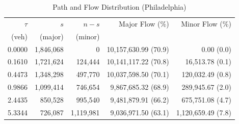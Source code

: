 \documentclass[11pt]{article}
\begin{document}
\begin{table}[ht]
\centering
\caption{Path and Flow Distribution (Philadelphia)}
\label{tab:pathflow-philly}
{\small\begin{tabular}{rrrrr}
\toprule
$\tau$ & $s$ & $n - s$ & Major Flow (\%) & Minor Flow (\%) \\
(veh) & (major) & (minor) &  &  \\
\midrule
0.0000 & 1{,}846{,}068 & 0 & 10{,}157{,}630.99 (70.9) & 0.00 (0.0) \\
0.1610 & 1{,}721{,}624 & 124{,}444 & 10{,}141{,}117.22 (70.8) & 16{,}513.78 (0.1) \\
0.4473 & 1{,}348{,}298 & 497{,}770 & 10{,}037{,}598.50 (70.1) & 120{,}032.49 (0.8) \\
0.9866 & 1{,}099{,}414 & 746{,}654 & 9{,}867{,}685.32 (68.9) & 289{,}945.67 (2.0) \\
2.4435 & 850{,}528 & 995{,}540 & 9{,}481{,}879.91 (66.2) & 675{,}751.08 (4.7) \\
5.3344 & 726{,}087 & 1{,}119{,}981 & 9{,}036{,}971.50 (63.1) & 1{,}120{,}659.49 (7.8) \\
\bottomrule
\end{tabular}}
\end{table}
 
 
\end{document}
